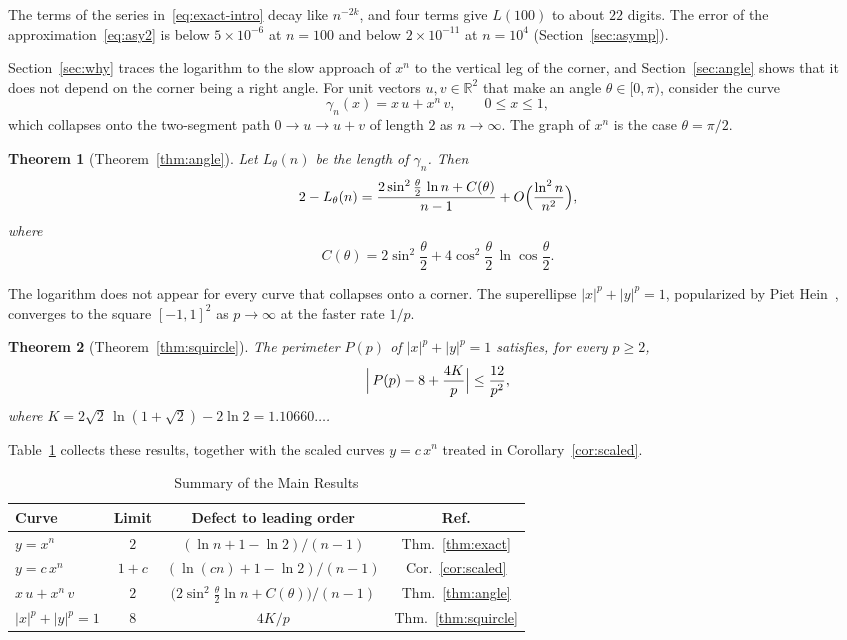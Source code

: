 \documentclass[journal]{IEEEtran}
\newtheorem{mainthm}{Theorem}
\newcommand{\R}{\mathbb{R}}
\begin{document}
The terms of the series in~\eqref{eq:exact-intro} decay like $n^{-2k}$, and four terms
give $L(100)$ to about $22$ digits. The error of the approximation~\eqref{eq:asy2} is
below $5\times10^{-6}$ at $n=100$ and below $2\times10^{-11}$ at $n=10^4$
(Section~\ref{sec:asymp}).

Section~\ref{sec:why} traces the logarithm to the slow approach of $x^n$ to the vertical leg
of the corner, and Section~\ref{sec:angle} shows that it does not depend on the corner being a
right angle. For unit vectors $u,v\in\R^2$ that make
an angle $\theta\in[0,\pi)$, consider the curve
\begin{equation}\label{eq:gamma}
  \gamma_n(x)=x\,u+x^n\,v,\qquad 0\le x\le1,
\end{equation}
which collapses onto the two-segment path $0\to u\to u+v$ of length $2$ as $n\to\infty$. The
graph of $x^n$ is the case $\theta=\pi/2$.

\begin{mainthm}[Theorem~\ref{thm:angle}]\label{thmC}
Let $L_\theta(n)$ be the length of $\gamma_n$. Then
\[
  2-L_\theta(n)=\frac{2\sin^2\frac{\theta}{2}\,\ln n+C(\theta)}{n-1}
  +O\Bigl(\frac{\ln^2n}{n^2}\Bigr),
\]
where
\[
  C(\theta)=2\sin^2\frac{\theta}{2}+4\cos^2\frac{\theta}{2}\,\ln\cos\frac{\theta}{2}.
\]
\end{mainthm}

The logarithm does not appear for every curve that collapses onto a corner. The superellipse
$|x|^p+|y|^p=1$, popularized by Piet Hein~\cite{Gardner}, converges to the square $[-1,1]^2$
as $p\to\infty$ at the faster rate $1/p$.

\begin{mainthm}[Theorem~\ref{thm:squircle}]\label{thmD}
The perimeter $P(p)$ of $|x|^p+|y|^p=1$ satisfies, for every $p\ge2$,
\[
  \Bigl|\,P(p)-8+\frac{4K}{p}\Bigr|\le\frac{12}{p^2},
\]
where $K=2\sqrt2\,\ln(1+\sqrt2)-2\ln2=1.10660\ldots$.
\end{mainthm}

Table~\ref{tab:summary} collects these results, together with the scaled curves $y=c\,x^n$
treated in Corollary~\ref{cor:scaled}.

\begin{table}[!t]
\caption{Summary of the Main Results}
\label{tab:summary}
\centering
\renewcommand{\arraystretch}{1.3}
\begin{tabular}{@{}lccc@{}}
\toprule
Curve & Limit & Defect to leading order & Ref.\\
\midrule
$y=x^n$ & $2$ & $(\ln n+1-\ln2)/(n-1)$ & Thm.~\ref{thm:exact}\\
$y=c\,x^n$ & $1+c$ & $(\ln(cn)+1-\ln2)/(n-1)$ & Cor.~\ref{cor:scaled}\\
$x\,u+x^n\,v$ & $2$ & $\bigl(2\sin^2\frac\theta2\ln n+C(\theta)\bigr)/(n-1)$ & Thm.~\ref{thm:angle}\\
$|x|^p+|y|^p=1$ & $8$ & $4K/p$ & Thm.~\ref{thm:squircle}\\
\bottomrule
\end{tabular}
\end{table}
\end{document}
